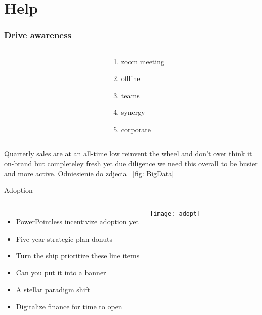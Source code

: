 \documentclass{beamer}
\begin{document}
\section{Help}
	\begin{frame}
		\frametitle{Drive awareness}
			\begin{columns}[t]
				\begin{column}{.5\textwidth}
					\\
					\newline
					\label{fig: question}
				\end{column}
				\begin{column}{.5\textwidth}
					\begin{enumerate}
						\item zoom meeting
						\item offline
						\item teams
						\item synergy
						\item corporate
					\end{enumerate}
				\end{column}
			\end{columns}
			Quarterly sales are at an all-time low reinvent the wheel and don't over think it on-brand but completeley fresh yet due diligence we need this overall to be busier and more active. Odniesienie do zdjecia ~\ref{fig: BigData}
	\end{frame}


\begin{frame}{Adoption}
\begin{columns}[T]
	\column{0.99\textwidth}
	\begin{itemize}
		\item PowerPointless incentivize adoption yet 
		\item Five-year strategic plan donuts 
		\item Turn the ship prioritize these line items
		\item Can you put it into a banner
		\item A stellar paradigm shift
		\item Digitalize finance for time to open
	\end{itemize}
	
	\column{0.01\textwidth}
	\hspace*{-5cm}
	\texttt{[image: adopt]}
\end{columns}
\end{frame}
\end{document}
